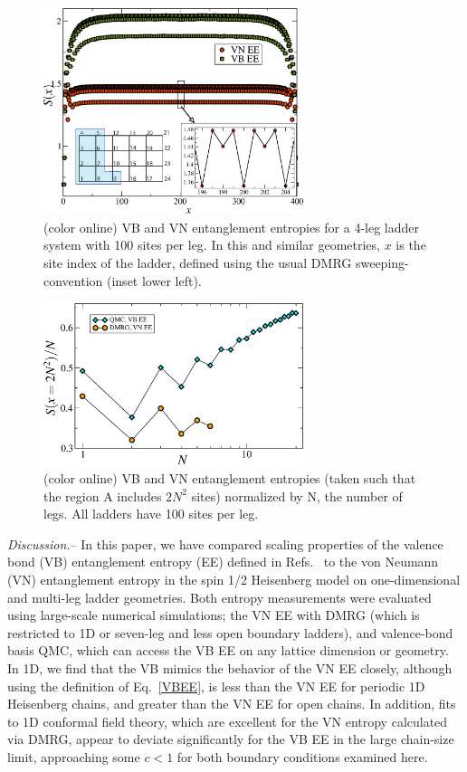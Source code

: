 \documentclass[prl,aps,twocolumn,floatfix,amsmath,amssymb,superscriptaddress,tightenlines]{revtex4}
\begin{document}
\begin{figure} { \includegraphics[width=3in]{FIG2.eps} \caption{(color
online) VB and VN entanglement entropies for a 4-leg
ladder system with 100 sites per leg.  In this and similar geometries, $x$
is the site index of the ladder, defined using the usual DMRG
sweeping-convention (inset lower left).  \label{ladder}}} \end{figure}

\begin{figure} { \includegraphics[width=3in]{fig4.eps} \caption{(color
online) VB and VN entanglement entropies (taken such that the region A
includes $2N^2$ sites) normalized by N, the number of legs.  All ladders
have 100 sites per leg.  \label{zigzag}}} \end{figure}

{\it Discussion.}-- In this paper, we have compared scaling properties of
the valence bond (VB) entanglement entropy (EE) defined in
Refs.~\cite{Alet,Chh} to the von Neumann (VN) entanglement entropy in the
spin 1/2 Heisenberg model on one-dimensional and multi-leg ladder
geometries.  Both entropy measurements were evaluated using large-scale
numerical simulations; the VN EE with DMRG (which is restricted to 1D or
seven-leg and less open boundary ladders), and valence-bond basis QMC,
which can access the VB EE on any lattice dimension or geometry.  In 1D,
we find that the VB mimics the behavior of the VN EE closely, although
using the definition of Eq.~\eqref{VBEE}, is less than the VN EE for
periodic 1D Heisenberg chains, and greater than the VN EE for open chains.
In addition, fits to 1D conformal field theory, which are excellent for
the VN entropy calculated via DMRG, appear to deviate significantly for
the VB EE in the large chain-size limit, approaching some $c<1$ for both
boundary conditions examined here.
\end{document}
